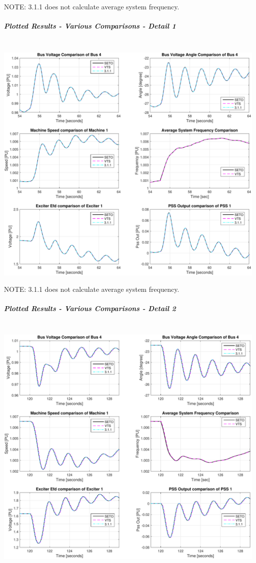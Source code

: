 \documentclass[12pt]{article}
\begin{document}
NOTE: 3.1.1 does not calculate average system frequency.

\pagebreak
\subparagraph{Plotted Results - Various Comparisons - Detail 1} \ \\
\includegraphics[width=\linewidth]{verCompDetail1}

NOTE: 3.1.1 does not calculate average system frequency.

\pagebreak
\subparagraph{Plotted Results - Various Comparisons - Detail 2} \ \\
\includegraphics[width=\linewidth]{verCompDetail2}
\end{document}
